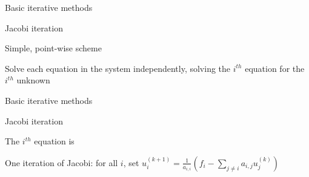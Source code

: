 \documentclass[18pt,xcolor=table]{beamer}
\begin{document}
\begin{frame}{Basic iterative methods}
\begin{block}{Jacobi iteration}
\bit
\item Simple, point-wise scheme
\item Solve each equation in the system independently, solving the $i^{th}$ equation for the $i^{th}$ unknown
\eit
{}
\end{block}
\end{frame}

\begin{frame}{Basic iterative methods}
\begin{block}{Jacobi iteration}
\bit
\item The $i^{th}$ equation is
\eit
{}
\bit
\item One iteration of Jacobi: for all $i$, set $u^{(k+1)}_i = \frac{1}{a_{i,i}} (f_i - \sum_{j\neq i} a_{i,j}u^{(k)}_j)$
\eit
\end{block}
\end{frame}
\end{document}
